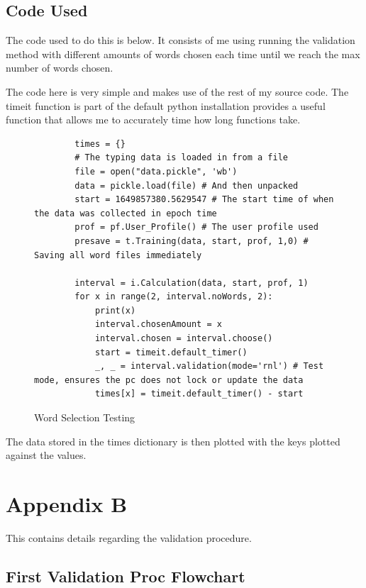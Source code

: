 \documentclass[10pt,a4paper]{report}
\begin{document}
\section*{Code Used}
The code used to do this is below. It consists of me using running the validation method with different amounts of words chosen each time until we reach the max number of words chosen.

The code here is very simple and makes use of the rest of my source code. The timeit function\cite{pythonsoftwarefoundation_2022} is part of the default python installation provides a useful function that allows me to accurately time how long functions take. 

\begin{figure}[h!]
	\begin{lstlisting}
		times = {}
		# The typing data is loaded in from a file
		file = open("data.pickle", 'wb')
		data = pickle.load(file) # And then unpacked
		start = 1649857380.5629547 # The start time of when the data was collected in epoch time
		prof = pf.User_Profile() # The user profile used
		presave = t.Training(data, start, prof, 1,0) # Saving all word files immediately
		
		interval = i.Calculation(data, start, prof, 1)
		for x in range(2, interval.noWords, 2):
			print(x)
			interval.chosenAmount = x
			interval.chosen = interval.choose()
			start = timeit.default_timer()
			_, _ = interval.validation(mode='rnl') # Test mode, ensures the pc does not lock or update the data
			times[x] = timeit.default_timer() - start
	\end{lstlisting}
	\caption{Word Selection Testing}
	\label{fig:selTest}
\end{figure}

The data stored in the times dictionary is then plotted with the keys plotted against the values.

\chapter*{Appendix B}

This contains details regarding the validation procedure.

\section*{First Validation Proc Flowchart}
\end{document}
